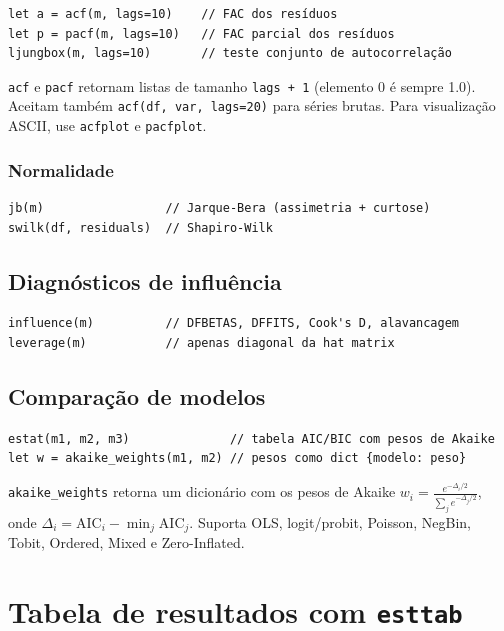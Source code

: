 \begin{lstlisting}
let a = acf(m, lags=10)    // FAC dos resíduos
let p = pacf(m, lags=10)   // FAC parcial dos resíduos
ljungbox(m, lags=10)       // teste conjunto de autocorrelação
\end{lstlisting}

\texttt{acf} e \texttt{pacf} retornam listas de tamanho \texttt{lags + 1}
(elemento 0 é sempre 1.0). Aceitam também \texttt{acf(df, var, lags=20)} para
séries brutas. Para visualização ASCII, use \texttt{acfplot} e \texttt{pacfplot}.

\subsubsection*{Normalidade}

\begin{lstlisting}
jb(m)                 // Jarque-Bera (assimetria + curtose)
swilk(df, residuals)  // Shapiro-Wilk
\end{lstlisting}

\subsection{Diagnósticos de influência}

\begin{lstlisting}
influence(m)          // DFBETAS, DFFITS, Cook's D, alavancagem
leverage(m)           // apenas diagonal da hat matrix
\end{lstlisting}

\subsection{Comparação de modelos}

\begin{lstlisting}
estat(m1, m2, m3)              // tabela AIC/BIC com pesos de Akaike
let w = akaike_weights(m1, m2) // pesos como dict {modelo: peso}
\end{lstlisting}

\texttt{akaike\_weights} retorna um dicionário com os pesos de Akaike
$w_i = \frac{e^{-\Delta_i/2}}{\sum_j e^{-\Delta_j/2}}$, onde $\Delta_i =
\mathrm{AIC}_i - \min_j \mathrm{AIC}_j$. Suporta OLS, logit/probit, Poisson,
NegBin, Tobit, Ordered, Mixed e Zero-Inflated.

\section{Tabela de resultados com \texttt{esttab}}

